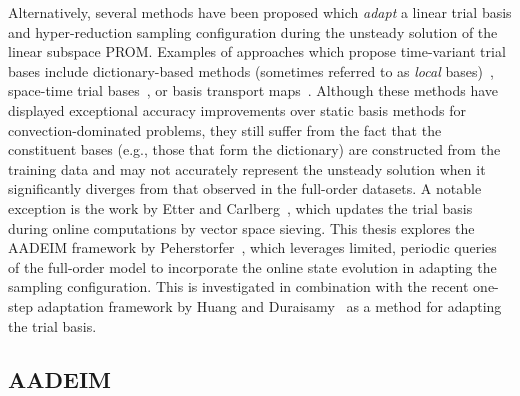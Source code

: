 Alternatively, several methods have been proposed which \textit{adapt} a linear trial basis and hyper-reduction sampling configuration during the unsteady solution of the linear subspace PROM. Examples of approaches which propose time-variant trial bases include dictionary-based methods (sometimes referred to as \textit{local} bases)~\cite{Amsallem2012,Peherstorfer2014,Abgrall2016}, space-time trial bases~\cite{Choi2019,Hoang2022}, or basis transport maps~\cite{Iollo2014}. Although these methods have displayed exceptional accuracy improvements over static basis methods for convection-dominated problems, they still suffer from the fact that the constituent bases (e.g., those that form the dictionary) are constructed from the training data and may not accurately represent the unsteady solution when it significantly diverges from that observed in the full-order datasets. A notable exception is the work by Etter and Carlberg~\cite{Etter2019}, which updates the trial basis during online computations by vector space sieving. This thesis explores the AADEIM framework by Peherstorfer~\cite{Peherstorfer2015,Peherstorfer2020Adaptive}, which leverages limited, periodic queries of the full-order model to incorporate the online state evolution in adapting the sampling configuration. This is investigated in combination with the recent one-step adaptation framework by Huang and Duraisamy~\cite{Huang2022a} as a method for adapting the trial basis.

\subsection{AADEIM}

